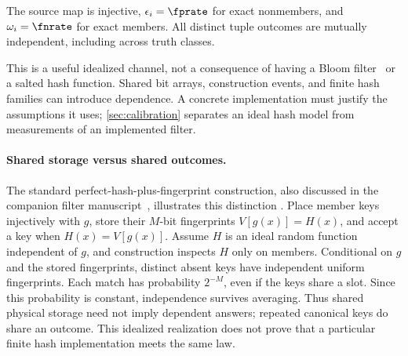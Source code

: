 \documentclass[../main.tex]{subfiles}
\begin{document}
\begin{assumption}
\label{asm:ber_trial}
The source map is injective, $\epsilon_i=\fprate$ for exact nonmembers,
and $\omega_i=\fnrate$ for exact members. All distinct tuple outcomes are
mutually independent, including across truth classes.
\end{assumption}
This is a useful idealized channel, not a consequence of having a
Bloom filter~\cite{bf} or a salted hash function. Shared bit arrays, construction
events, and finite hash families can introduce dependence. A concrete
implementation must justify the assumptions it uses; \cref{sec:calibration}
separates an ideal hash model from measurements of an implemented filter.

\paragraph{Shared storage versus shared outcomes.}
The standard perfect-hash-plus-fingerprint construction, also discussed in
the companion filter manuscript~\cite{phf}, illustrates this distinction
\cite{dietzfelbinger2008retrieval}. Place member keys injectively with $g$,
store their $M$-bit fingerprints $V[g(x)]=H(x)$, and accept a key when
$H(x)=V[g(x)]$. Assume $H$ is an ideal random function independent of $g$,
and construction inspects $H$ only on members. Conditional on $g$ and the
stored fingerprints, distinct absent keys have independent uniform
fingerprints. Each match has probability $2^{-M}$, even if the keys share
a slot. Since this probability is constant, independence survives averaging.
Thus shared physical storage need not imply dependent answers; repeated
canonical keys do share an outcome. This idealized realization does not
prove that a particular finite hash implementation meets the same law.
\end{document}
